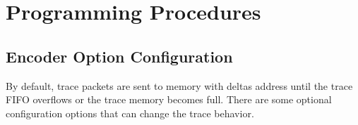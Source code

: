 \documentclass[main\_\_EN.tex]{subfiles}
\begin{document}

\section{Programming Procedures}
\label{sec:riscvtracenc-prog-procedures}

\subsection{Encoder Option Configuration}

By default, trace packets are sent to memory with deltas address until the trace FIFO overflows or the trace memory becomes full. There are some optional configuration options that can change the trace behavior.
\end{document}
